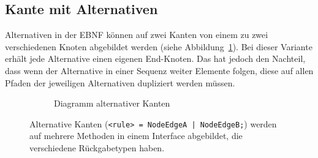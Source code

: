 \documentclass[../InterneDSLs.tex]{subfiles}
\begin{document}
\subsection{Kante mit Alternativen}\label{SEC:Alternative}
Alternativen in der EBNF können auf zwei Kanten von einem zu zwei verschiedenen Knoten abgebildet werden (siehe Abbildung~\ref{FIG:DiagramAlternativeNodeVariant}). Bei dieser Variante erhält jede Alternative einen eigenen End-Knoten. Das hat jedoch den Nachteil, dass wenn der Alternative in einer Sequenz weiter Elemente folgen, diese auf allen Pfaden der jeweiligen Alternativen dupliziert werden müssen.
\begin{figure}[ht]
\centering
  \begin{subfigure}[c]{0.49\textwidth}
    \caption{Diagramm alternativer Kanten}
    \label{FIG:DiagramAlternativeNodeVariant}
  \end{subfigure}
  \begin{subfigure}[c]{0.49\textwidth}
    
  \end{subfigure}
  \caption[Abbildung alternativer Kanten Variante 1]{Alternative Kanten (\texttt{<rule> = NodeEdgeA | NodeEdgeB;}) werden auf mehrere Methoden in einem Interface abgebildet, die verschiedene Rückgabetypen haben.}
  \label{FIG:AlternativeNodeVariant}
\end{figure}
\end{document}
